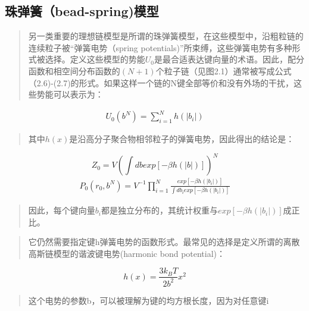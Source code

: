 \documentclass{article}
\begin{document}
	\begin{sloppypar}
		\begin{CJK}{UTF8}{gkai}
			\section{珠弹簧（bead-spring)模型}
			\begin{quotation}
				另一类重要的理想链模型是所谓的珠弹簧模型，在这些模型中，沿粗粒链的连续粒子被“弹簧电势（spring potentials)”所束缚，这些弹簧电势有多种形式被选择。定义这些模型的势能$U_{0}$是最合适表达键向量的术语。因此，配分函数和相空间分布函数的$(N+1)$个粒子链（见图2.1）通常被写成公式（2.6)-(2.7)的形式。如果这样一个链的N键全部等价和没有外场的干扰，这些势能可以表示为：
			\end{quotation} 
			\begin{equation}
			\begin{split}
			U_{0}(b^{N})= \sum_{i=1}^{N}h(|b_{i}|)
			\end{split}
			\end{equation}
			\begin{quotation}
				其中$h(x)$是沿高分子聚合物相邻粒子的弹簧电势，因此得出的结论是：
			\end{quotation}
			\begin{equation}
			Z_{0}=V(\int db exp[-\beta h(|b|)])^N 
			\end{equation}
			\begin{equation}
			\begin{split}		
			P_{0} (r_{0},b^N) =V^{-1} \prod_{i=1}^{N} \frac{exp[-\beta h(|b_{i}|)]}{\int d b_{i}exp[-\beta h(|b_{i}|)]}
			\end{split}
			\end{equation}
			\begin{quotation}
				因此，每个键向量$b_{i}$都是独立分布的，其统计权重与$exp[-\beta h(|b_{i}|)]$成正比。 
			\end{quotation}
			\begin{quotation}
				它仍然需要指定键h弹簧电势的函数形式。最常见的选择是定义所谓的离散高斯链模型的谐波键电势(harmonic bond potential)： 
			\end{quotation}
			\begin{equation}
			h(x)=\frac{3k_{B}T}{2b^2} x^2  
			\end{equation}
			\begin{quotation}
				这个电势的参数b，可以被理解为键的均方根长度，因为对任意键i 
			\end{quotation}
			\begin{equation}

\end{equation}
\end{CJK}
\end{sloppypar}
\end{document}
